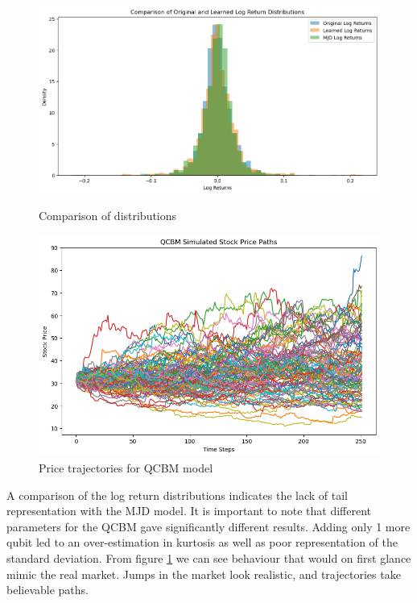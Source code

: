 \documentclass[12pt]{article}
\numberwithin{equation}{section}
\begin{document}
\begin{figure}[h!]
    \centering
    \begin{minipage}{0.48\textwidth}
        \centering
        \includegraphics[width=\linewidth]{compdists.png}
        \caption{Comparison of distributions}
        \label{fig:compdists}
    \end{minipage}
    \hfill
    \begin{minipage}{0.48\textwidth}
        \centering
        \includegraphics[width=\linewidth]{pricepath2.png}
        \caption{Price trajectories for QCBM model}
        \label{fig:pricepath}
    \end{minipage}
\end{figure}

A comparison of the log return distributions indicates the lack of tail representation 
with the MJD model. It is important to note that different parameters for the QCBM 
gave significantly different results. Adding only 1 more qubit led to an 
over-estimation in kurtosis as well as poor representation of the standard 
deviation. From figure \ref{fig:pricepath} we can see behaviour that would on 
first glance mimic the real market. Jumps in the market look realistic, and 
trajectories take believable paths.
\end{document}
